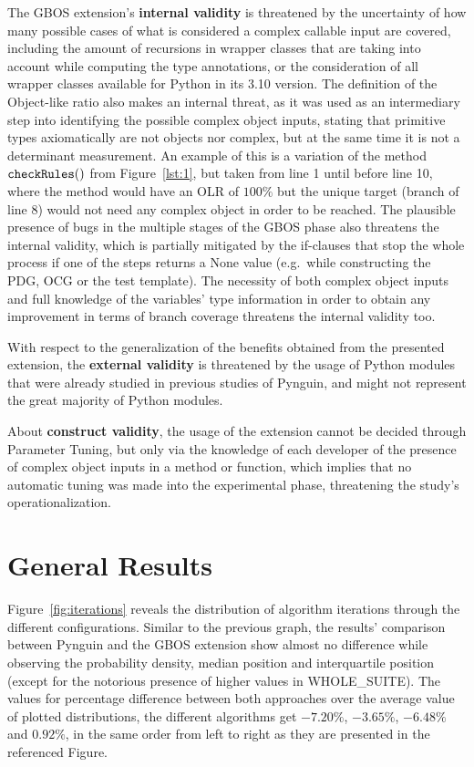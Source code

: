 \documentclass[%
  chapterprefix=false,%
  open=right,%
  twoside=true,%
  paper=a4,%
  logofile={Figures/logo.png},%
  thesistype=master,%
  UKenglish,%
]{se2thesis}
\newcommand{\callable}[2][]{\(\text{\texttt{#2}}(#1)\)}
\begin{document}
The GBOS extension's \textbf{internal validity} is threatened by the uncertainty of how many possible cases of what is considered a complex callable input are covered, including the amount of recursions in wrapper classes that are taking into account while computing the type annotations, or the consideration of all wrapper classes available for Python in its 3.10 version.
The definition of the Object-like ratio also makes an internal threat, as it was used as an intermediary step into identifying the possible complex object inputs, stating that primitive types axiomatically are not objects nor complex, but at the same time it is not a determinant measurement.
An example of this is a variation of the method \callable[]{checkRules} from Figure~\ref{lst:1}, but taken from line 1 until before line 10, where the method would have an OLR of \(100\%\) but the unique target (branch of line 8) would not need any complex object in order to be reached.
The plausible presence of bugs in the multiple stages of the GBOS phase also threatens the internal validity, which is partially mitigated by the if-clauses that stop the whole process if one of the steps returns a None value (e.g.\ while constructing the PDG, OCG or the test template).
The necessity of both complex object inputs and full knowledge of the variables' type information in order to obtain any improvement in terms of branch coverage threatens the internal validity too.

With respect to the generalization of the benefits obtained from the presented extension, the \textbf{external validity} is threatened by the usage of Python modules that were already studied in previous studies of Pynguin, and might not represent the great majority of Python modules. 

About \textbf{construct validity}, the usage of the extension cannot be decided through Parameter Tuning, but only via the knowledge of each developer of the presence of complex object inputs in a method or function, which implies that no automatic tuning was made into the experimental phase, threatening the study's operationalization.

\iffalse

\section{General Results}

Figure~\ref{fig:iterations} reveals the distribution of algorithm iterations through the different configurations.
Similar to the previous graph, the results' comparison between Pynguin and the GBOS extension show almost no difference while observing the probability density, median position and interquartile position (except for the notorious presence of higher values in WHOLE\_SUITE).
The values for percentage difference between both approaches over the average value of plotted distributions, the different algorithms get \(-7.20\%\), \(-3.65\%\), \(-6.48\%\) and \(0.92\%\), in the same order from left to right as they are presented in the referenced Figure.
\end{document}

